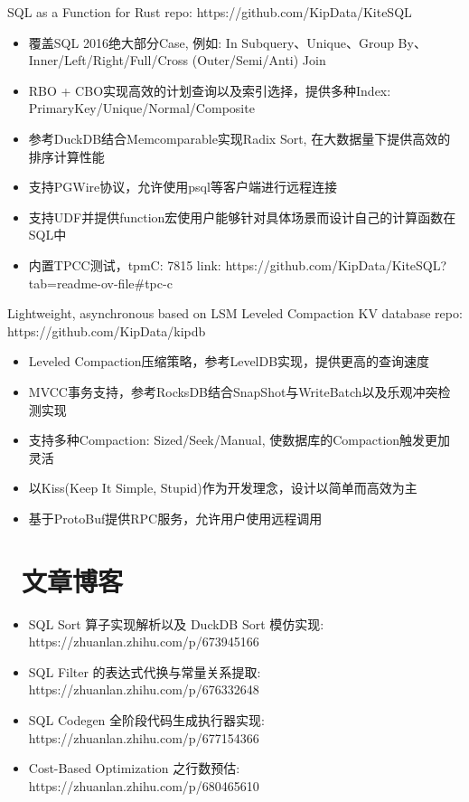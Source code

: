 \documentclass{resume}
\begin{document}
\begin{onehalfspacing}
  SQL as a Function for Rust  repo: https://github.com/KipData/KiteSQL
  \begin{itemize}
    \item 覆盖SQL 2016绝大部分Case, 例如: In Subquery、Unique、Group By、Inner/Left/Right/Full/Cross (Outer/Semi/Anti) Join
    \item RBO + CBO实现高效的计划查询以及索引选择，提供多种Index: PrimaryKey/Unique/Normal/Composite
    \item 参考DuckDB结合Memcomparable实现Radix Sort, 在大数据量下提供高效的排序计算性能
    \item 支持PGWire协议，允许使用psql等客户端进行远程连接
    \item 支持UDF并提供function宏使用户能够针对具体场景而设计自己的计算函数在SQL中
    \item 内置TPCC测试，tpmC: 7815 link: https://github.com/KipData/KiteSQL?tab=readme-ov-file#tpc-c
  \end{itemize}
\end{onehalfspacing}

\begin{onehalfspacing}
  Lightweight, asynchronous based on LSM Leveled Compaction KV database  repo: https://github.com/KipData/kipdb
  \begin{itemize}
    \item Leveled Compaction压缩策略，参考LevelDB实现，提供更高的查询速度
    \item MVCC事务支持，参考RocksDB结合SnapShot与WriteBatch以及乐观冲突检测实现
    \item 支持多种Compaction: Sized/Seek/Manual, 使数据库的Compaction触发更加灵活
    \item 以Kiss(Keep It Simple, Stupid)作为开发理念，设计以简单而高效为主
    \item 基于ProtoBuf提供RPC服务，允许用户使用远程调用
  \end{itemize}
\end{onehalfspacing}

\section{\faUsers\ 文章博客}
\begin{itemize}
  \item SQL Sort 算子实现解析以及 DuckDB Sort 模仿实现: https://zhuanlan.zhihu.com/p/673945166
  \item SQL Filter 的表达式代换与常量关系提取: https://zhuanlan.zhihu.com/p/676332648
  \item SQL Codegen 全阶段代码生成执行器实现: https://zhuanlan.zhihu.com/p/677154366
  \item Cost-Based Optimization 之行数预估: https://zhuanlan.zhihu.com/p/680465610
\end{itemize}
\end{document}

